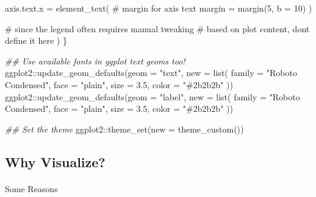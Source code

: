 \documentclass[
  letterpaper,
  DIV=11,
  numbers=noendperiod]{scrartcl}
\makeatletter
\let\oldparagraph\paragraph
\renewcommand{\paragraph}{
    \@ifstar
      \xxxParagraphStar
      \xxxParagraphNoStar
  }
\newcommand{\xxxParagraphStar}[1]{\oldparagraph*{#1}\mbox{}}
\newcommand{\xxxParagraphNoStar}[1]{\oldparagraph{#1}\mbox{}}
\newenvironment{Shaded}{\begin{snugshade}}{\end{snugshade}}
\newcommand{\AttributeTok}[1]{\textcolor[rgb]{0.40,0.45,0.13}{#1}}
\newcommand{\CommentTok}[1]{\textcolor[rgb]{0.37,0.37,0.37}{#1}}
\newcommand{\DecValTok}[1]{\textcolor[rgb]{0.68,0.00,0.00}{#1}}
\newcommand{\DocumentationTok}[1]{\textcolor[rgb]{0.37,0.37,0.37}{\textit{#1}}}
\newcommand{\FloatTok}[1]{\textcolor[rgb]{0.68,0.00,0.00}{#1}}
\newcommand{\FunctionTok}[1]{\textcolor[rgb]{0.28,0.35,0.67}{#1}}
\newcommand{\NormalTok}[1]{\textcolor[rgb]{0.00,0.23,0.31}{#1}}
\newcommand{\SpecialCharTok}[1]{\textcolor[rgb]{0.37,0.37,0.37}{#1}}
\newcommand{\StringTok}[1]{\textcolor[rgb]{0.13,0.47,0.30}{#1}}
\makeatother
\begin{document}
\begin{Shaded}
\begin{Highlighting}[]
      \AttributeTok{axis.text.x =} \FunctionTok{element\_text}\NormalTok{( }\CommentTok{\# margin for axis text}
        \AttributeTok{margin =} \FunctionTok{margin}\NormalTok{(}\DecValTok{5}\NormalTok{, }\AttributeTok{b =} \DecValTok{10}\NormalTok{)}
\NormalTok{      )}

      \CommentTok{\# since the legend often requires manual tweaking}
      \CommentTok{\# based on plot content, don\textquotesingle{}t define it here}
\NormalTok{    )}
\NormalTok{\}}

\DocumentationTok{\#\# Use available fonts in ggplot text geoms too!}
\NormalTok{ggplot2}\SpecialCharTok{::}\FunctionTok{update\_geom\_defaults}\NormalTok{(}\AttributeTok{geom =} \StringTok{"text"}\NormalTok{, }\AttributeTok{new =} \FunctionTok{list}\NormalTok{(}
  \AttributeTok{family =} \StringTok{"Roboto Condensed"}\NormalTok{,}
  \AttributeTok{face =} \StringTok{"plain"}\NormalTok{,}
  \AttributeTok{size =} \FloatTok{3.5}\NormalTok{,}
  \AttributeTok{color =} \StringTok{"\#2b2b2b"}
\NormalTok{))}
\NormalTok{ggplot2}\SpecialCharTok{::}\FunctionTok{update\_geom\_defaults}\NormalTok{(}\AttributeTok{geom =} \StringTok{"label"}\NormalTok{, }\AttributeTok{new =} \FunctionTok{list}\NormalTok{(}
  \AttributeTok{family =} \StringTok{"Roboto Condensed"}\NormalTok{,}
  \AttributeTok{face =} \StringTok{"plain"}\NormalTok{,}
  \AttributeTok{size =} \FloatTok{3.5}\NormalTok{,}
  \AttributeTok{color =} \StringTok{"\#2b2b2b"}
\NormalTok{))}

\DocumentationTok{\#\# Set the theme}
\NormalTok{ggplot2}\SpecialCharTok{::}\FunctionTok{theme\_set}\NormalTok{(}\AttributeTok{new =} \FunctionTok{theme\_custom}\NormalTok{())}
\end{Highlighting}
\end{Shaded}

\subsection{\texorpdfstring{ Why
Visualize?}{ Why Visualize?}}\label{why-visualize}

\paragraph{Some Reasons}\label{some-reasons}
\end{document}
